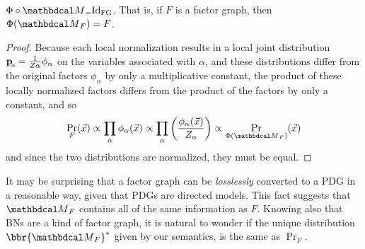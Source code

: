 {\begin{prop}\label{prop:fg-pdg-lossless}
	$\Phi \circ \PDGof = \mathrm{Id}_{\text{FG}}$. That is, if $F$ is a factor graph, then $\Phi(\PDGof{F}) = F$.
\end{prop}
\begin{proof}
	Because each local normalization results in a local joint
			distribution $\bp[\alpha] = \frac{1}{Z\alpha}
			\phi_\alpha$ on the variables associated with $\alpha$, and these distributions differ from the original factors $\phi_\alpha$ by only a multiplicative 
		   constant, the product of these locally normalized factors differs from the product of the factors by only a constant, and so 
	\[ \Pr_F(\vec x) \propto \prod_\alpha \phi_\alpha(\vec x) \propto \prod_\alpha \left(\frac{\phi_\alpha(\vec x)}{Z_\alpha}\right) \propto \Pr_{\Phi(\PDGof{F})}(\vec x) \]
	and since the two distributions are normalized, they must be equal.
\end{proof}


It may be surprising that a factor graph can be \emph{losslessly} converted to a PDG in a reasonable way, given that PDGs are directed models.
This fact suggests that $\PDGof{F}$ contains all of the same information as $F$. Knowing also that BNs are a kind of factor graph, it is natural to wonder if the unique distribution $\bbr{\PDGof{F}}^*$ given by our semantics, is the same as $\Pr_F$.		


	
}
